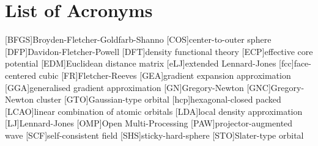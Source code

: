
\chapter*{List of Acronyms}

\begin{acronym}[ABCDEFGHIJK]
    [BFGS]{Broyden-Fletcher-Goldfarb-Shanno}
    [COS]{center-to-outer sphere}
    [DFP]{Davidon-Fletcher-Powell}
    [DFT]{density functional theory}
    [ECP]{effective core potential}
    [EDM]{Euclidean distance matrix}
    [eLJ]{extended Lennard-Jones}
    [fcc]{face-centered cubic}
    [FR]{Fletcher-Reeves}
	[GEA]{gradient expansion approximation}
	[GGA]{generalised gradient approximation}
    [GN]{Gregory-Newton}
    [GNC]{Gregory-Newton cluster}
    [GTO]{Gaussian-type orbital}
    [hcp]{hexagonal-closed packed}
    [LCAO]{linear combination of atomic orbitals}
    [LDA]{local density approximation}
    [LJ]{Lennard-Jones}
    [OMP]{Open Multi-Processing}
    [PAW]{projector-augmented wave}
    [SCF]{self-consistent field}
    [SHS]{sticky-hard-sphere}
    [STO]{Slater-type orbital}
\end{acronym}

